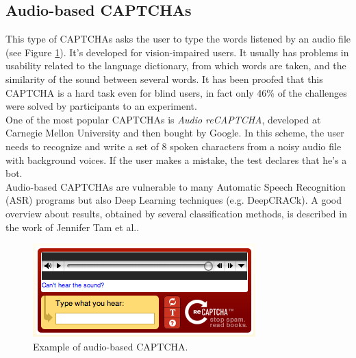 \subsection{Audio-based CAPTCHAs}
This type of CAPTCHAs asks the user to type the words listened by an audio file (see Figure \ref{soa:audio_CAPTCHA}). It's developed for vision-impaired users. It usually has problems in usability related to the language dictionary, from which words are taken, and the similarity of the sound between several words. It has been proofed that this CAPTCHA is a hard task even for blind users, in fact  only 46\% of the challenges were solved by participants to an experiment\cite{usability_audio}.\\
One of the most popular CAPTCHAs is \textit{Audio reCAPTCHA}, developed at Carnegie Mellon University and then bought by Google. In this scheme, the user needs to recognize and write a set of 8 spoken characters from a noisy audio file with background voices. If the user makes a mistake, the test declares that he's a bot.\\
Audio-based CAPTCHAs are vulnerable to many Automatic Speech Recognition (ASR) programs\cite{improving_audio} but also Deep Learning techniques (e.g. DeepCRACk\cite{DeepCRACk}). A good overview about results, obtained by several classification methods, is described in the work of Jennifer Tam et al.\cite{break_audio}.
\begin{figure}[h]
     \centering
     \includegraphics[width=.5\linewidth]{Images/StateOfArt/audio_CAPTCHA}
     \caption{\footnotesize{Example of audio-based CAPTCHA.}}\label{soa:audio_CAPTCHA}
\end{figure}

